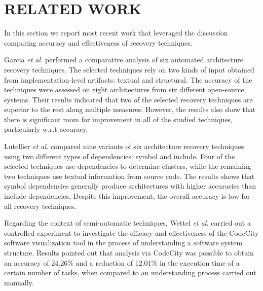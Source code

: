 \section{RELATED WORK}\label{sec:related}

 In this section we report most recent work that leveraged the discussion comparing accuracy and effectiveness of recovery techniques.

Garcia \textit{et al.} \cite{Garcia:ASE2013} performed a comparative analysis of six automated architecture recovery techniques. The selected techniques rely on two kinds of input obtained from im\-ple\-mentation-level artifacts: textual and structural. The accuracy of the techniques were assessed on eight architectures from six different open-source systems. Their results indicated that two of the selected recovery techniques are superior to the rest along multiple measures. However, the results also show that there is significant room for improvement in all of the studied techniques, particularly w.r.t accuracy.

Lutellier \textit{et al.} \cite{Lutellier_2015} compared nine variants of six architecture recovery techniques using two different types of dependencies: symbol and include. Four of the selected techniques use dependencies to determine clusters, while the remaining two techniques use textual information from source code. The results shows that symbol dependencies generally produce architectures with higher accuracies than include dependencies. Despite this improvement, the overall accuracy is low for all recovery techniques.

Regarding the context of semi-automatic techniques, Wettel \textit{et al.} \cite{wettel_software_2011} carried out a controlled experiment to investigate the efficacy and effectiveness of the CodeCity software visualization tool in the process of understanding a software system structure. Results pointed out that analysis via CodeCity was possible to obtain an accuracy of 24.26\% and a reduction of 12.01\% in the execution time of a certain number of tasks, when compared to an understanding process carried out manually. %